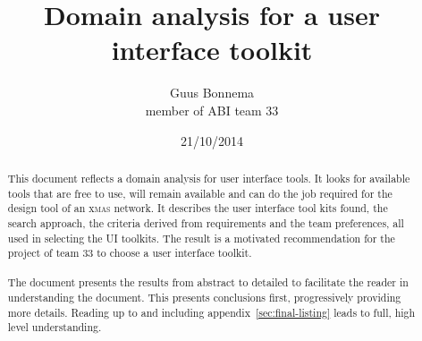 \documentclass[a4paper,11pt,draft]{article}
\author{Guus Bonnema\\member of ABI team 33}
\date{21/10/2014}
\title{\color{blue}Domain analysis for a user interface toolkit}
\begin{document}

\newcommand{\xmas}{x\textsc{mas}}%
\newcommand{\ok}{$\checkmark$}
\newcommand{\w}[1]{\textbf{\textsc{#1}}}
\newcommand\bw[1]{{\color{blue}#1}}

\newcommand{\mybox}[1]{\begin{boxedminipage}[t]{\textwidth}#1\end{boxedminipage}}



\newcommand\smp[1]{%
	\marginpar{\color{blue}\small\bf\textsc#1}
}%
\newcommand\smpp[1]{\smp{#1}#1}


\maketitle

\begin{abstract}

	\noindent{} This document reflects a \bw{domain analysis} for user
	interface tools. It looks for available tools that are free to use, will
	remain available and can do the job required for the design tool of an
	\xmas{} network.  It describes the user interface tool kits found, the
	search approach, the criteria derived from requirements and the team
	preferences, all used in selecting the UI toolkits. The result is a
	motivated recommendation for the project of team 33 to choose a user
	interface toolkit. 
	
	\paragraph{} The document presents the results from abstract to detailed to
	facilitate the reader in understanding the document. This presents
	conclusions first, progressively providing more details. Reading up to and
	including appendix~\ref{sec:final-listing} leads to full, high level
	understanding.

\end{abstract}
\end{document}
